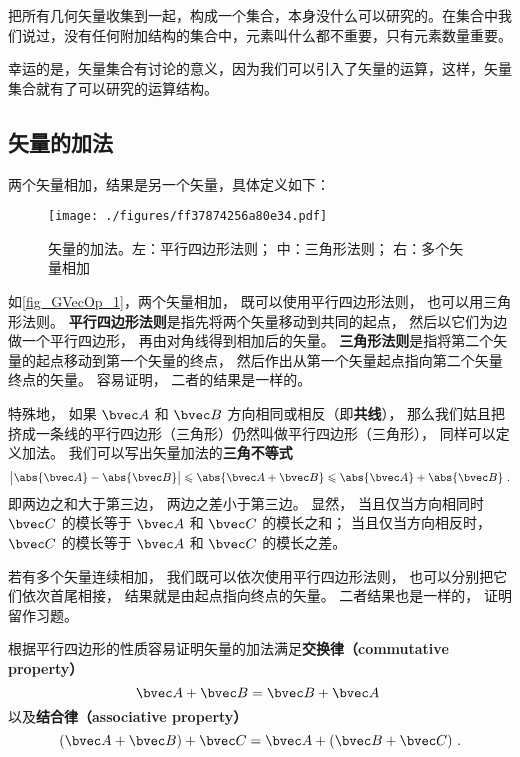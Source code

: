 

把所有几何矢量收集到一起，构成一个集合，本身没什么可以研究的。在集合中我们说过，没有任何附加结构的集合中，元素叫什么都不重要，只有元素数量重要。

幸运的是，矢量集合有讨论的意义，因为我们可以引入了矢量的运算，这样，矢量集合就有了可以研究的运算结构。

\subsection{矢量的加法}
两个矢量相加，结果是另一个矢量，具体定义如下：
\begin{figure}[ht]
\centering
\texttt{[image: ./figures/ff37874256a80e34.pdf]}
\caption{矢量的加法。左：平行四边形法则； 中：三角形法则； 右：多个矢量相加} \label{fig_GVecOp_1}
\end{figure}
如\autoref{fig_GVecOp_1}，两个矢量相加， 既可以使用平行四边形法则， 也可以用三角形法则。 \textbf{平行四边形法则}是指先将两个矢量移动到共同的起点， 然后以它们为边做一个平行四边形， 再由对角线得到相加后的矢量。 \textbf{三角形法则}是指将第二个矢量的起点移动到第一个矢量的终点， 然后作出从第一个矢量起点指向第二个矢量终点的矢量。 容易证明， 二者的结果是一样的。

特殊地， 如果 $\bvec A$ 和 $\bvec B$ 方向相同或相反（即\textbf{共线}）， 那么我们姑且把挤成一条线的平行四边形（三角形）仍然叫做平行四边形（三角形）， 同样可以定义加法。 我们可以写出矢量加法的\textbf{三角不等式}
\begin{equation}
\big|\abs{\bvec A} - \abs{\bvec B}\big| \leqslant \abs{\bvec A + \bvec B} \leqslant \abs{\bvec A} + \abs{\bvec B}~.
\end{equation}
即两边之和大于第三边， 两边之差小于第三边。 显然， 当且仅当方向相同时 $\bvec C$ 的模长等于 $\bvec A$ 和 $\bvec C$ 的模长之和； 当且仅当方向相反时， $\bvec C$ 的模长等于 $\bvec A$ 和 $\bvec C$ 的模长之差。 

若有多个矢量连续相加， 我们既可以依次使用平行四边形法则， 也可以分别把它们依次首尾相接， 结果就是由起点指向终点的矢量。 二者结果也是一样的， 证明留作习题。

根据平行四边形的性质容易证明矢量的加法满足\textbf{交换律（commutative property）}
\begin{equation}
\bvec A + \bvec B = \bvec B + \bvec A~
\end{equation}
以及\textbf{结合律（associative property）}
\begin{equation}
(\bvec A + \bvec B) + \bvec C = \bvec A + (\bvec B + \bvec C)~.
\end{equation}

